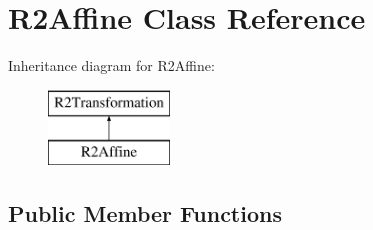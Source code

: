 \hypertarget{class_r2_affine}{}\section{R2\+Affine Class Reference}
\label{class_r2_affine}
Inheritance diagram for R2\+Affine\+:\begin{figure}[H]
\begin{center}
\leavevmode
\includegraphics[height=2.000000cm]{class_r2_affine}
\end{center}
\end{figure}
\subsection*{Public Member Functions}
